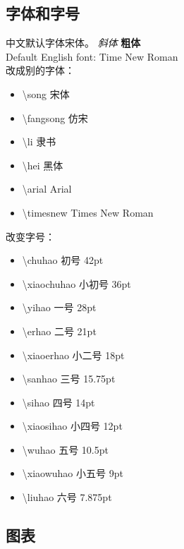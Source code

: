 \documentclass{tjumaster}
\begin{document}
\subsection{字体和字号}

	中文默认字体宋体。 \textit{斜体} \textbf{粗体} \\
	Default English font: Time New Roman\\
	
	 改成别的字体：
	 \begin{itemize}
	 \item {\song \textbackslash song 宋体}
	 \item {\fangsong \textbackslash fangsong 仿宋}
	 \item {\li \textbackslash li 隶书}
	 \item {\hei \textbackslash hei 黑体}
	 \item {\arial \textbackslash arial Arial}
	 \item {\timesnew \textbackslash timesnew Times New Roman}
	 \end{itemize}
	 
	 \vspace*{1em}改变字号：
	 \begin{itemize}
		 \item {\chuhao \textbackslash chuhao 初号 42pt}
		 \item {\xiaochuhao \textbackslash xiaochuhao 小初号 36pt}
		 \item {\yihao \textbackslash yihao 一号 28pt}
		 \item {\erhao  \textbackslash erhao 二号 21pt}
		 \item {\xiaoerhao \textbackslash xiaoerhao 小二号 18pt}
		 \item {\sanhao \textbackslash sanhao 三号 15.75pt}
		 \item {\sihao \textbackslash sihao 四号 14pt}
		 \item {\xiaosihao \textbackslash xiaosihao 小四号 12pt}
		 \item {\wuhao \textbackslash wuhao 五号 10.5pt}
		 \item {\xiaowuhao \textbackslash xiaowuhao 小五号 9pt}
		 \item {\liuhao \textbackslash liuhao 六号 7.875pt}
		 
	 \end{itemize}


\subsection{图表}
\end{document}

